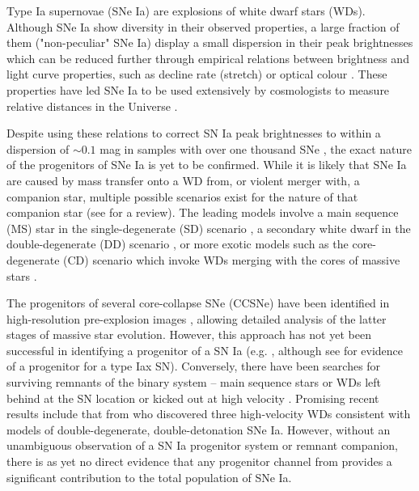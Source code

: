 \documentclass[fleqn,usenatbib]{mnras}
\begin{document}
Type Ia supernovae (SNe Ia) are explosions of white dwarf stars (WDs). Although SNe Ia show diversity in their observed properties, a large fraction of them ("non-peculiar" SNe Ia) display a small dispersion in their peak brightnesses which can be reduced further through empirical relations between brightness and light curve properties, such as decline rate (stretch) or optical colour \citep{Rust1974,Pskovskii1977,Phillips1993,Tripp1998}. These properties have led SNe Ia to be used extensively by cosmologists to measure relative distances in the Universe \citep{Riess1998,Perlmutter1999}.

Despite using these relations to correct SN Ia peak brightnesses to within a dispersion of $\sim 0.1$ mag in samples with over one thousand SNe \citep{Scolnic2018}, the exact nature of the progenitors of SNe Ia is yet to be confirmed. While it is likely that SNe Ia are caused by mass transfer onto a WD from, or violent merger with, a companion star, multiple possible scenarios exist for the nature of that companion star (see \citealt{Maoz2014} for a review). The leading models involve a main sequence (MS) star in the single-degenerate (SD) scenario \citep{Whelan1973,Nomoto1982}, a secondary white dwarf in the double-degenerate (DD) scenario \citep{Tutukov1976,Iben1984,Webbink1984}, or more exotic models such as the core-degenerate (CD) scenario which invoke WDs merging with the cores of massive stars \citep{Soker2019}. 

The progenitors of several core-collapse SNe (CCSNe) have been identified in high-resolution pre-explosion images \citep{Smartt2009,Eldridge2013}, allowing detailed analysis of the latter stages of massive star evolution. However, this approach has not yet been successful in identifying a progenitor of a SN Ia (e.g. \citealt{Graur2014a,Kelly2014,Graur2019}, although see \citet{McCully2014} for evidence of a progenitor for a type Iax SN). Conversely, there have been searches for surviving remnants of the binary system -- main sequence stars or WDs left behind at the SN location or kicked out at high velocity \citep[e.g.][]{Schaefer2012,Ruiz-Lapuente2018,Kerzendorf2018,Kerzendorf2019}. Promising recent results include that from \citet{Shen2018} who discovered three high-velocity WDs consistent with models of double-degenerate, double-detonation SNe Ia. However, without an unambiguous observation of a SN Ia progenitor system or remnant companion, there is as yet no direct evidence that any progenitor channel from provides a significant contribution to the total population of SNe Ia.
\end{document}
